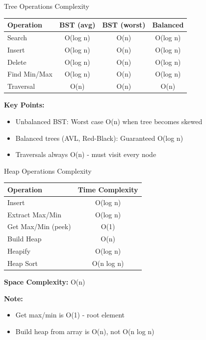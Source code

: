 \documentclass[aspectratio=169]{beamer}
\begin{document}
\begin{frame}{Tree Operations Complexity}
  \begin{table}
    \centering
    \begin{tabular}{|l|c|c|c|}
      \hline
      \textbf{Operation} & \textbf{BST (avg)} & \textbf{BST (worst)} & \textbf{Balanced} \\
      \hline
      Search & O(log n) & O(n) & O(log n) \\
      \hline
      Insert & O(log n) & O(n) & O(log n) \\
      \hline
      Delete & O(log n) & O(n) & O(log n) \\
      \hline
      Find Min/Max & O(log n) & O(n) & O(log n) \\
      \hline
      Traversal & O(n) & O(n) & O(n) \\
      \hline
    \end{tabular}
  \end{table}

  \vspace{0.5cm}
  \textbf{Key Points:}
  \begin{itemize}
    \item Unbalanced BST: Worst case O(n) when tree becomes skewed
    \item Balanced trees (AVL, Red-Black): Guaranteed O(log n)
    \item Traversals always O(n) - must visit every node
  \end{itemize}
\end{frame}

\begin{frame}{Heap Operations Complexity}
  \begin{table}
    \centering
    \begin{tabular}{|l|c|}
      \hline
      \textbf{Operation} & \textbf{Time Complexity} \\
      \hline
      Insert & O(log n) \\
      \hline
      Extract Max/Min & O(log n) \\
      \hline
      Get Max/Min (peek) & O(1) \\
      \hline
      Build Heap & O(n) \\
      \hline
      Heapify & O(log n) \\
      \hline
      Heap Sort & O(n log n) \\
      \hline
    \end{tabular}
  \end{table}

  \vspace{0.5cm}
  \textbf{Space Complexity:} O(n)

  \vspace{0.3cm}
  \textbf{Note:}
  \begin{itemize}
    \item Get max/min is O(1) - root element
    \item Build heap from array is O(n), not O(n log n)
  \end{itemize}
\end{frame}
\end{document}
